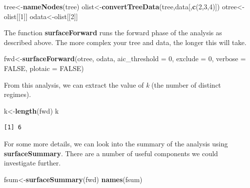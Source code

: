 \documentclass[
]{book}
\newenvironment{Shaded}{\begin{snugshade}}{\end{snugshade}}
\newcommand{\DataTypeTok}[1]{\textcolor[rgb]{0.13,0.29,0.53}{#1}}
\newcommand{\DecValTok}[1]{\textcolor[rgb]{0.00,0.00,0.81}{#1}}
\newcommand{\KeywordTok}[1]{\textcolor[rgb]{0.13,0.29,0.53}{\textbf{#1}}}
\newcommand{\NormalTok}[1]{#1}
\newcommand{\OtherTok}[1]{\textcolor[rgb]{0.56,0.35,0.01}{#1}}
\begin{document}
\begin{Shaded}
\begin{Highlighting}[]
\NormalTok{tree\textless{}{-}}\KeywordTok{nameNodes}\NormalTok{(tree)}
\NormalTok{olist\textless{}{-}}\KeywordTok{convertTreeData}\NormalTok{(tree,data[,}\KeywordTok{c}\NormalTok{(}\DecValTok{2}\NormalTok{,}\DecValTok{3}\NormalTok{,}\DecValTok{4}\NormalTok{)])}
\NormalTok{otree\textless{}{-}olist[[}\DecValTok{1}\NormalTok{]]}
\NormalTok{odata\textless{}{-}olist[[}\DecValTok{2}\NormalTok{]]}
\end{Highlighting}
\end{Shaded}

The function \textbf{surfaceForward} runs the forward phase of the analysis as described above. The more complex your tree and data, the longer this will take.

\begin{Shaded}
\begin{Highlighting}[]
\NormalTok{fwd\textless{}{-}}\KeywordTok{surfaceForward}\NormalTok{(otree, odata, }\DataTypeTok{aic\_threshold =} \DecValTok{0}\NormalTok{, }\DataTypeTok{exclude =} \DecValTok{0}\NormalTok{, }
                    \DataTypeTok{verbose =} \OtherTok{FALSE}\NormalTok{, }\DataTypeTok{plotaic =} \OtherTok{FALSE}\NormalTok{)}
\end{Highlighting}
\end{Shaded}

From this analysis, we can extract the value of \emph{k} (the number of distinct regimes).

\begin{Shaded}
\begin{Highlighting}[]
\NormalTok{k\textless{}{-}}\KeywordTok{length}\NormalTok{(fwd)}
\NormalTok{k}
\end{Highlighting}
\end{Shaded}

\begin{verbatim}
[1] 6
\end{verbatim}

For some more details, we can look into the summary of the analysis using \textbf{surfaceSummary}. There are a number of useful components we could investigate further.

\begin{Shaded}
\begin{Highlighting}[]
\NormalTok{fsum\textless{}{-}}\KeywordTok{surfaceSummary}\NormalTok{(fwd)}
\KeywordTok{names}\NormalTok{(fsum)}
\end{Highlighting}
\end{Shaded}
\end{document}
